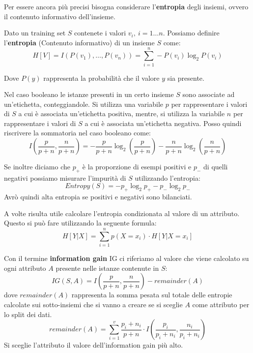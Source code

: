 Per essere ancora più precisi bisogna considerare l'\textbf{entropia} degli insiemi, ovvero il contenuto informativo dell'insieme.
\begin{definizione}
     Dato un training set $S$ contenete i valori $v_i, \ i = 1 \dots n$. Possiamo definire l'\textbf{entropia} (Contenuto informativo) di un insieme $S$ come:
     \begin{equation}
         H[V] = I(P(v_1), \dots, P(v_n)) = \sum_{i = 1}^n - P(v_i) \log_{2} P(v_i)
     \end{equation}

     Dove $P(y)$ rappresenta la probabilità che il valore $y$ sia presente.
     
     Nel caso booleano le istanze presenti in un certo insieme $S$ sono associate ad un'etichetta, conteggiandole. Si utilizza una variabile $p$ per rappresentare i valori di $S$ a cui è associata un'etichetta positiva, mentre, si utilizza la variabile $n$ per rappresentare i valori di $S$ a cui è associata un'etichetta negativa. Posso quindi riscrivere la sommatoria nel caso booleano come:
     \begin{equation}
         I\left(\frac{p}{p + n}, \frac{n}{p + n}\right) = -\frac{p}{p + n} \log_2 \left( \frac{p}{p + n} \right) - \frac{n}{p + n} \log_2 \left(\frac{n}{p + n}\right)
     \end{equation}

     Se inoltre diciamo che $p_{+}$ è la proporzione di esempi positivi e $p_{-}$ di quelli negativi possiamo misurare l'impurità di $S$ utilizzando l'entropia:
     \begin{equation}
         Entropy(S) = - p_{+} \log_2 p_{+} - p_{-} \log_2 p_{-}
     \end{equation}
     Avrò quindi alta entropia se positivi e negativi sono bilanciati.
\end{definizione}

A volte risulta utile calcolare l'entropia condizionata al valore di un attributo. Questo si può fare utilizzando la seguente formula: 
\begin{equation}
    H[Y | X] = \sum_{i = 1}^n p(X = x_i) \cdot H[Y | X = x_i]
\end{equation}

Con il termine \textbf{information gain} IG ci riferiamo al valore che viene calcolato su ogni attributo $A$ presente nelle istanze contenute in $S$:
\begin{equation}
    IG(S, A) = I\left(\frac{p}{p + n}, \frac{n}{p + n}\right) - remainder(A)
\end{equation}
dove $remainder(A)$ rappresenta la somma pesata sul totale delle entropie calcolate sui sotto-insiemi che si vanno a creare se si sceglie $A$ come attributo per lo split dei dati.
\begin{equation}
    remainder(A) = \sum_{i=1}^v \frac{p_i + n_i}{p + n} \cdot I\left(\frac{p_i}{p_i + n_i}, \frac{n_i}{p_i + n_i}\right)
\end{equation}
Si sceglie l'attributo il valore dell'information gain più alto.

